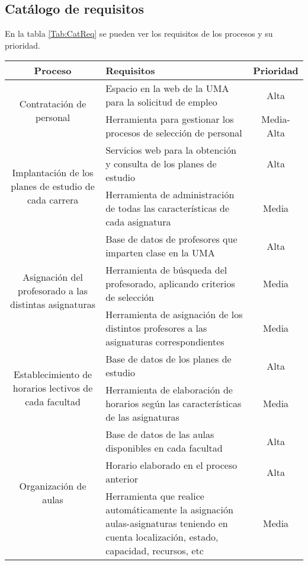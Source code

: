 \documentclass[11pt,a4paper,spanish,twoside]{book}
\begin{document}
\subsection{Catálogo de requisitos} \label{ss:4.3.1}
En la tabla \ref{Tab:CatReq} se pueden ver los requisitos de los procesos y
su prioridad.

\begin{table}[!h]
\centering
\small
  \begin{tabular}{c|p{5cm}|c}
    \textbf{Proceso} & \textbf{Requisitos} & \textbf{Prioridad} \\
    \hline \hline
    \multirow{2}{4cm}{Contratación de personal}
    & Espacio en la web de la UMA para la solicitud de empleo & Alta \\
    \cline{2-3}
    & Herramienta para gestionar los procesos de selección de personal &
    Media-Alta\\ \hline

    \multirow{2}{4cm}{Implantación de los planes de estudio de cada
      carrera}
    & Servicios web para la obtención y consulta de los planes de estudio &
    Alta\\ \cline{2-3}
    & Herramienta de administración de todas las características de cada
    asignatura & Media\\  \hline

    \multirow{3}{4cm}{Asignación del profesorado a las distintas asignaturas}
    & Base de datos de profesores que imparten clase en la UMA & Alta \\ 
    \cline{2-3}
    & Herramienta de búsqueda del profesorado, aplicando criterios de selección
    & Media\\ \cline{2-3}
    & Herramienta de asignación de los distintos profesores a las
    asignaturas correspondientes & Media\\ \hline
     
    \multirow{2}{4cm}{Establecimiento de horarios lectivos de cada facultad}
    & Base de datos de los planes de estudio & Alta\\ \cline{2-3}
    & Herramienta de elaboración de horarios según las características de
    las asignaturas & Media \\ \hline
    
    \multirow{3}{4cm}{Organización de aulas}
    & Base de datos de las aulas disponibles en cada facultad & Alta\\
    \cline{2-3}
    & Horario elaborado en el proceso anterior & Alta \\
    \cline{2-3}
    & Herramienta que realice automáticamente la asignación
    aulas-asignaturas teniendo en cuenta localización, estado, capacidad,
    recursos, etc & Media \\ \hline
    

\end{tabular}
\end{table}
\end{document}
